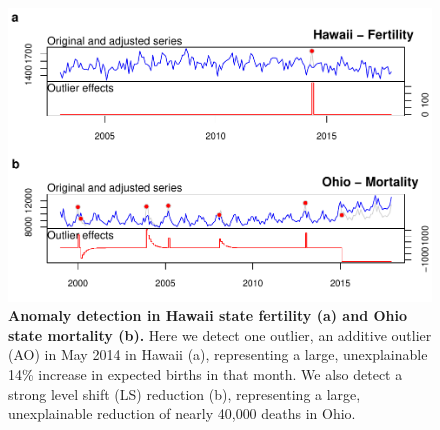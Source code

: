 \documentclass[12pt]{article}
\begin{document}
\begin{figure}
\centering
\includegraphics{manuscript_files/figure-latex/TrueAnomalies-1.pdf}
\caption{\textbf{Anomaly detection in Hawaii state fertility (a) and Ohio state mortality (b).}
Here we detect one outlier, an additive outlier (AO) in May 2014 in
Hawaii (a), representing a large, unexplainable 14\% increase in
expected births in that month. We also detect a strong level shift (LS)
reduction (b), representing a large, unexplainable reduction of nearly
40,000 deaths in Ohio. \label{fig:ferthawaii}}
\end{figure}

\newpage



\end{document}
